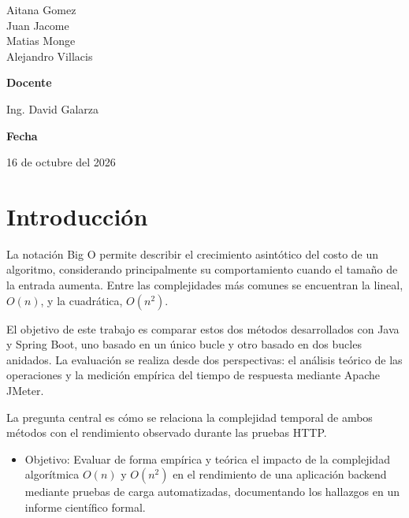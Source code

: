 \documentclass[runningheads]{llncs}
\begin{document}
\begin{titlepage}
    \vspace{0.3cm}

    Aitana Gomez\\[0.2cm]
    Juan Jacome\\[0.2cm]
    Matias Monge\\[0.2cm]
    Alejandro Villacis

    \vspace{0.65cm}

    {\large\bfseries Docente\par}

    \vspace{0.15cm}

    Ing. David Galarza

    \vspace{0.45cm}

    {\large\bfseries Fecha\par}

    \vspace{0.15cm}

    16 de octubre del 2026

    \vfill
\end{titlepage}


\section{Introducción}

La notación Big O permite describir el crecimiento
asintótico del costo de un algoritmo, considerando
principalmente su comportamiento cuando el tamaño
de la entrada aumenta. Entre las complejidades más
comunes se encuentran la lineal, $O(n)$, y la
cuadrática, $O(n^2)$.

El objetivo de este trabajo es comparar estos dos métodos
desarrollados con Java y Spring Boot, uno basado en
un único bucle y otro basado en dos bucles anidados.
La evaluación se realiza desde dos perspectivas:
el análisis teórico de las operaciones y la medición
empírica del tiempo de respuesta mediante Apache
JMeter.

La pregunta central es cómo se relaciona la
complejidad temporal de ambos métodos con el
rendimiento observado durante las pruebas HTTP.

\begin{itemize}
    \item Objetivo: Evaluar de forma empírica y teórica el impacto de la complejidad algorítmica 
    $O(n)$ y $O(n^2)$ en el rendimiento de una aplicación backend mediante pruebas de carga automatizadas, documentando los hallazgos en un informe científico formal.
\end{itemize}
\end{document}
